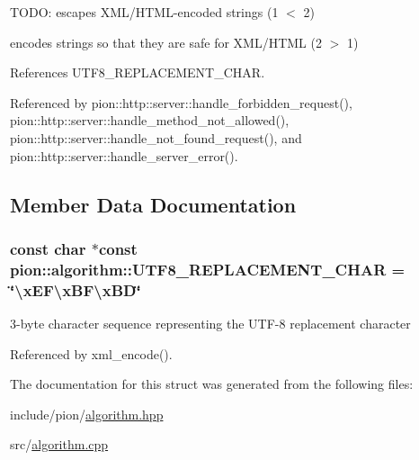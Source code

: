T\-O\-D\-O\-: escapes X\-M\-L/\-H\-T\-M\-L-\/encoded strings (1 $<$ 2) 

encodes strings so that they are safe for X\-M\-L/\-H\-T\-M\-L (2 $>$ 1) 

References U\-T\-F8\-\_\-\-R\-E\-P\-L\-A\-C\-E\-M\-E\-N\-T\-\_\-\-C\-H\-A\-R.



Referenced by pion\-::http\-::server\-::handle\-\_\-forbidden\-\_\-request(), pion\-::http\-::server\-::handle\-\_\-method\-\_\-not\-\_\-allowed(), pion\-::http\-::server\-::handle\-\_\-not\-\_\-found\-\_\-request(), and pion\-::http\-::server\-::handle\-\_\-server\-\_\-error().



\subsection{Member Data Documentation}
\hypertarget{structpion_1_1algorithm_ad068c4b57bfaefc287dcda5681095603}{
\subsubsection[{U\-T\-F8\-\_\-\-R\-E\-P\-L\-A\-C\-E\-M\-E\-N\-T\-\_\-\-C\-H\-A\-R}]{\setlength{\rightskip}{0pt plus 5cm}const char $\ast$const pion\-::algorithm\-::\-U\-T\-F8\-\_\-\-R\-E\-P\-L\-A\-C\-E\-M\-E\-N\-T\-\_\-\-C\-H\-A\-R = \char`\"{}\textbackslash{}x\-E\-F\textbackslash{}x\-B\-F\textbackslash{}x\-B\-D\char`\"{}\hspace{0.3cm}{\ttfamily [static]}}}\label{structpion_1_1algorithm_ad068c4b57bfaefc287dcda5681095603}


3-\/byte character sequence representing the U\-T\-F-\/8 replacement character 



Referenced by xml\-\_\-encode().



The documentation for this struct was generated from the following files\-:\begin{DoxyCompactItemize}
\item 
include/pion/\hyperlink{algorithm_8hpp}{algorithm.\-hpp}\item 
src/\hyperlink{algorithm_8cpp}{algorithm.\-cpp}\end{DoxyCompactItemize}
